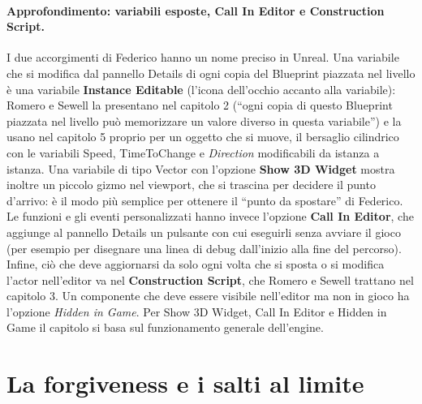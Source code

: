 \paragraph{Approfondimento: variabili esposte, Call In Editor e Construction Script.} I
due accorgimenti di Federico hanno un nome preciso in Unreal. Una variabile che si modifica
dal pannello Details di ogni copia del Blueprint piazzata nel livello è una variabile
\textbf{Instance Editable} (l'icona dell'occhio accanto alla variabile): Romero e Sewell la
presentano nel capitolo 2 (``ogni copia di questo Blueprint piazzata nel livello può
memorizzare un valore diverso in questa variabile'') e la usano nel capitolo 5 proprio per
un oggetto che si muove, il bersaglio cilindrico con le variabili Speed, TimeToChange e
\emph{Direction} modificabili da istanza a istanza. Una variabile di tipo Vector con
l'opzione \textbf{Show 3D Widget} mostra inoltre un piccolo gizmo nel viewport, che si
trascina per decidere il punto d'arrivo: è il modo più semplice per ottenere il ``punto da
spostare'' di Federico. Le funzioni e gli eventi personalizzati hanno invece l'opzione
\textbf{Call In Editor}, che aggiunge al pannello Details un pulsante con cui eseguirli
senza avviare il gioco (per esempio per disegnare una linea di debug dall'inizio alla fine
del percorso). Infine, ciò che deve aggiornarsi da solo ogni volta che si sposta o si
modifica l'actor nell'editor va nel \textbf{Construction Script}, che Romero e Sewell
trattano nel capitolo 3. Un componente che deve essere visibile nell'editor ma non in
gioco ha l'opzione \emph{Hidden in Game}. Per Show 3D Widget, Call In Editor e Hidden in
Game il capitolo si basa sul funzionamento generale dell'engine.

\section{La forgiveness e i salti al limite}
\label{ue14:sec:forgiveness}


